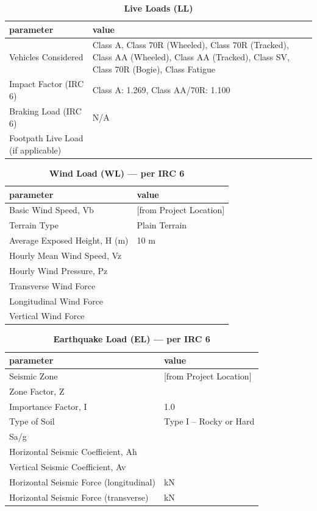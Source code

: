 \documentclass[12pt,a4paper]{report}
\numberwithin{table}{chapter}
\numberwithin{figure}{chapter}
\begin{document}
\vspace{1em}
\begin{longtable}{|L{5.5cm}|p{10.0cm}|}
\caption{\textbf{Live Loads (LL)}}
\hline
\textbf{parameter} & \textbf{value} \\
\hline
\textnormal{Vehicles Considered} & Class A, Class 70R (Wheeled), Class 70R (Tracked), Class AA (Wheeled), Class AA (Tracked), Class SV, Class 70R (Bogie), Class Fatigue \\[6pt]
\hline
\textnormal{Impact Factor (IRC 6)} & Class A:\allowbreak{} 1.269, Class AA/70R:\allowbreak{} 1.100 \\[6pt]
\hline
\textnormal{Braking Load (IRC 6)} & N/A \\[6pt]
\hline
\textnormal{Footpath Live Load (if applicable)} &  \\[6pt]
\hline
\end{longtable}

\vspace{1em}
\begin{longtable}{|L{5.5cm}|p{10.0cm}|}
\caption{\textbf{Wind Load (WL) --- per IRC 6}}
\hline
\textbf{parameter} & \textbf{value} \\
\hline
\textnormal{Basic Wind Speed, Vb} &  [from Project Location] \\[6pt]
\hline
\textnormal{Terrain Type} & Plain Terrain \\[6pt]
\hline
\textnormal{Average Exposed Height, H (m)} & 10 m \\[6pt]
\hline
\textnormal{Hourly Mean Wind Speed, Vz} &  \\[6pt]
\hline
\textnormal{Hourly Wind Pressure, Pz} &  \\[6pt]
\hline
\textnormal{Transverse Wind Force} &  \\[6pt]
\hline
\textnormal{Longitudinal Wind Force} &  \\[6pt]
\hline
\textnormal{Vertical Wind Force} &  \\[6pt]
\hline
\end{longtable}

\vspace{1em}
\begin{longtable}{|L{5.5cm}|p{10.0cm}|}
\caption{\textbf{Earthquake Load (EL) --- per IRC 6}}
\hline
\textbf{parameter} & \textbf{value} \\
\hline
\textnormal{Seismic Zone} &  [from Project Location] \\[6pt]
\hline
\textnormal{Zone Factor, Z} &  \\[6pt]
\hline
\textnormal{Importance Factor, I} & 1.0 \\[6pt]
\hline
\textnormal{Type of Soil} & Type I – Rocky or Hard \\[6pt]
\hline
\textnormal{Sa/g} &  \\[6pt]
\hline
\textnormal{Horizontal Seismic Coefficient, Ah} &  \\[6pt]
\hline
\textnormal{Vertical Seismic Coefficient, Av} &  \\[6pt]
\hline
\textnormal{Horizontal Seismic Force (longitudinal)} &  kN \\[6pt]
\hline
\textnormal{Horizontal Seismic Force (transverse)} &  kN \\[6pt]
\hline
\end{longtable}
\end{document}
